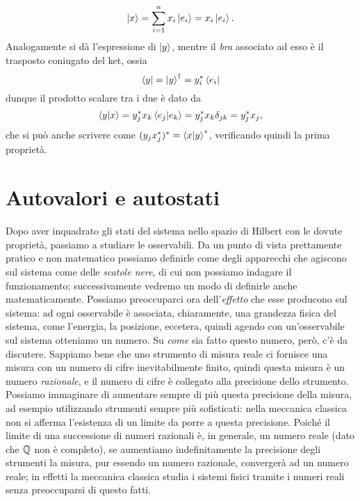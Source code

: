 \begin{equation}
	\left|{x}\right\rangle=\sum_{i=1}^nx_i\left|{e_i}\right\rangle=x_i\left|{e_i}\right\rangle.
\end{equation}
Analogamente si dà l'espressione di $\left|{y}\right\rangle$, mentre il \emph{bra} associato ad esso è il trasposto coniugato del ket, ossia
\begin{equation}
	\left\langle{y}\right|={\left|{y}\right\rangle}^\dagger=y_i^*\left\langle{e_i}\right|
\end{equation}
dunque il prodotto scalare tra i due è dato da
\begin{equation}
	\left\langle{y}\middle|{x}\right\rangle=y_j^*x_k\left\langle{e_j}\middle|{e_k}\right\rangle=y_j^*x_k\delta_{jk}=y_j^*x_j,
\end{equation}
che si può anche scrivere come $(y_jx_j^*)^*=\left\langle{x}\middle|{y}\right\rangle^*$, verificando quindi la prima proprietà.

\section{Autovalori e autostati}
Dopo aver inquadrato gli stati del sistema nello spazio di Hilbert con le dovute proprietà, passiamo a studiare le osservabili.
Da un punto di vista prettamente pratico e non matematico possiamo definirle come degli apparecchi che agiscono sul sistema come delle \emph{scatole nere}, di cui non possiamo indagare il funzionamento; successivamente vedremo un modo di definirle anche matematicamente.
Possiamo preoccuparci ora dell'\emph{effetto} che esse producono sul sistema: ad ogni osservabile è associata, chiaramente, una grandezza fisica del sistema, come l'energia, la posizione, eccetera, quindi agendo con un'osservabile sul sistema otteniamo un numero.
Su \emph{come} sia fatto questo numero, però, c'è da discutere.
Sappiamo bene che uno strumento di misura reale ci fornisce una misura con un numero di cifre inevitabilmente finito, quindi questa misura è un numero \emph{razionale}, e il numero di cifre è collegato alla precisione dello strumento.
Possiamo immaginare di aumentare sempre di più questa precisione della misura, ad esempio utilizzando strumenti sempre più sofisticati: nella meccanica classica non si afferma l'esistenza di un limite da porre a questa precisione.
Poich\'e il limite di una successione di numeri razionali è, in generale, un numero reale (dato che $\mathbb{Q}$ non è completo), se aumentiamo indefinitamente la precisione degli strumenti la misura, pur essendo un numero razionale, convergerà ad un numero reale; in effetti la meccanica classica studia i sistemi fisici tramite i numeri reali senza preoccuparsi di questo fatti.

